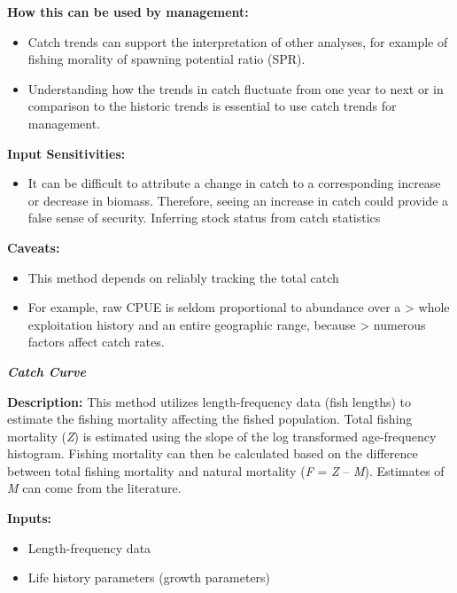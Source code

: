 \documentclass[]{book}
\providecommand{\tightlist}{%
  \setlength{\itemsep}{0pt}\setlength{\parskip}{0pt}}
\begin{document}
\textbf{How this can be used by management:}

\begin{itemize}
\item
  Catch trends can support the interpretation of other analyses, for
  example of fishing morality of spawning potential ratio (SPR).
\item
  Understanding how the trends in catch fluctuate from one year to next
  or in comparison to the historic trends is essential to use catch
  trends for management.
\end{itemize}

\textbf{Input Sensitivities:}

\begin{itemize}
\tightlist
\item
  It can be difficult to attribute a change in catch to a corresponding
  increase or decrease in biomass. Therefore, seeing an increase in
  catch could provide a false sense of security. Inferring stock status
  from catch statistics
\end{itemize}

\textbf{Caveats:}

\begin{itemize}
\item
  This method depends on reliably tracking the total catch
\item
  For example, raw CPUE is seldom proportional to abundance over a
  \textgreater{} whole exploitation history and an entire geographic
  range, because \textgreater{} numerous factors affect catch rates.
\end{itemize}

\textbf{\emph{Catch Curve}}

\textbf{Description:} This method utilizes length-frequency data (fish
lengths) to estimate the fishing mortality affecting the fished
population. Total fishing mortality (\emph{Z}) is estimated using the
slope of the log transformed age-frequency histogram. Fishing mortality
can then be calculated based on the difference between total fishing
mortality and natural mortality (\emph{F} = \emph{Z} -- \emph{M}).
Estimates of \emph{M} can come from the literature.

\textbf{Inputs:}

\begin{itemize}
\item
  Length-frequency data
\item
  Life history parameters (growth parameters)
\end{itemize}
\end{document}
